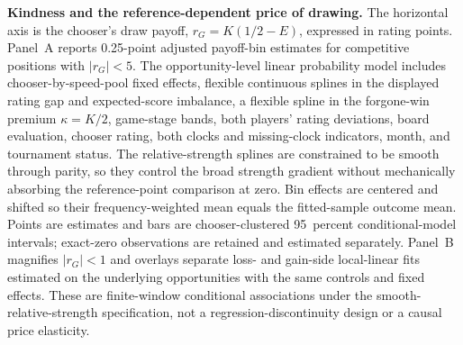 \caption{\textbf{Kindness and the reference-dependent price of drawing.}
The horizontal axis is the chooser's draw payoff, $r_G=K(1/2-E)$, expressed in
rating points. Panel~A reports 0.25-point adjusted
payoff-bin estimates for competitive positions with
$|r_G|<5$. The opportunity-level linear
probability model includes chooser-by-speed-pool fixed effects, flexible
continuous splines in the displayed rating gap and expected-score imbalance,
a flexible spline in the forgone-win premium $\kappa=K/2$, game-stage bands,
both players' rating deviations, board evaluation, chooser rating, both
clocks and missing-clock indicators, month, and tournament status. The
relative-strength splines are constrained to be smooth through parity, so
they control the broad strength gradient without mechanically absorbing the
reference-point comparison at zero. Bin effects are centered and shifted so
their frequency-weighted mean equals the fitted-sample outcome mean. Points
are estimates and bars are chooser-clustered 95~percent conditional-model
intervals; exact-zero observations are retained and estimated separately.
Panel~B magnifies $|r_G|<1$ and overlays separate loss- and
gain-side local-linear fits estimated on the underlying opportunities with
the same controls and fixed effects. These are finite-window conditional
associations under the smooth-relative-strength specification, not a
regression-discontinuity design or a causal price elasticity.}
